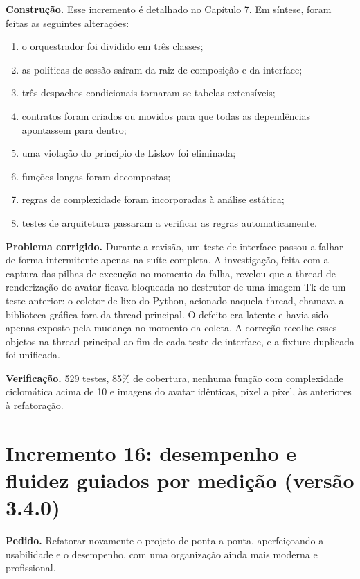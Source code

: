 \textbf{Construção.} Esse incremento é detalhado no Capítulo 7. Em síntese, foram feitas as seguintes
alterações:
\begin{enumerate}[label=\alph*)]
  \item o orquestrador foi dividido em três classes;
  \item as políticas de sessão saíram da raiz de composição e da interface;
  \item três despachos condicionais tornaram-se tabelas extensíveis;
  \item contratos foram criados ou movidos para que todas as dependências apontassem para dentro;
  \item uma violação do princípio de Liskov foi eliminada;
  \item funções longas foram decompostas;
  \item regras de complexidade foram incorporadas à análise estática;
  \item testes de arquitetura passaram a verificar as regras automaticamente.
\end{enumerate}

\textbf{Problema corrigido.} Durante a revisão, um teste de interface passou a falhar de forma
intermitente apenas na suíte completa. A investigação, feita com a captura das pilhas de execução no
momento da falha, revelou que a thread de renderização do avatar ficava bloqueada no destrutor de uma
imagem Tk de um teste anterior: o coletor de lixo do Python, acionado naquela thread, chamava a
biblioteca gráfica fora da thread principal. O defeito era latente e havia sido apenas exposto pela
mudança no momento da coleta. A correção recolhe esses objetos na thread principal ao fim de cada teste
de interface, e a fixture duplicada foi unificada.

\textbf{Verificação.} 529 testes, 85\% de cobertura, nenhuma função com complexidade ciclomática acima
de 10 e imagens do avatar idênticas, pixel a pixel, às anteriores à refatoração.

\section{Incremento 16: desempenho e fluidez guiados por medição (versão 3.4.0)}

\textbf{Pedido.} Refatorar novamente o projeto de ponta a ponta, aperfeiçoando a usabilidade e o
desempenho, com uma organização ainda mais moderna e profissional.

